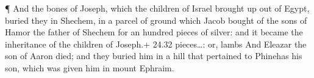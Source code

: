  ¶ And the bones of Joseph, which the children of Israel
brought up out of Egypt, buried they in Shechem, in a parcel of ground
which Jacob bought of the sons of Hamor the father of Shechem for an
hundred pieces of silver: and it became the inheritance of the children
of Joseph.+ 24.32 pieces\ldots: or, lambs  And Eleazar the
son of Aaron died; and they buried him in a hill that pertained to
Phinehas his son, which was given him in mount Ephraim.
